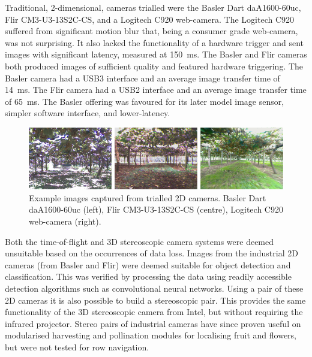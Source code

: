 \documentclass[preprint,authoryear,12pt]{elsarticle}
\begin{document}
        Traditional, 2-dimensional, cameras trialled were the Basler Dart daA1600-60uc, Flir CM3-U3-13S2C-CS, and a Logitech C920 web-camera.
        The Logitech C920 suffered from significant motion blur that, being a consumer grade web-camera, was not surprising.
        It also lacked the functionality of a hardware trigger and sent images with significant latency, measured at \SI{150}{\milli\second}.
        The Basler and Flir cameras both produced images of sufficient quality and featured hardware triggering.
        The Basler camera had a USB3 interface and an average image transfer time of \SI{14}{\milli\second}.
        The Flir camera had a USB2 interface and an average image transfer time of \SI{65}{\milli\second}.
        The Basler offering was favoured for its later model image sensor, simpler software interface, and lower-latency.

        \begin{figure}[htb]
            \centering
            \includegraphics[width=\linewidth]{imgs/camera_comparison/camera_comparison.pdf}
            \caption{
                Example images captured from trialled 2D cameras.
                Basler Dart daA1600-60uc (left), Flir CM3-U3-13S2C-CS (centre), Logitech C920 web-camera (right).
            }
            \label{fig:canopyDataCloud}
        \end{figure}

        Both the time-of-flight and 3D stereoscopic camera systems were deemed unsuitable based on the occurrences of data loss.
        Images from the industrial 2D cameras (from Basler and Flir) were deemed suitable for object detection and classification.
        This was verified by processing the data using readily accessible detection algorithms such as convolutional neural networks.
        Using a pair of these 2D cameras it is also possible to build a stereoscopic pair.
        This provides the same functionality of the 3D stereoscopic camera from Intel, but without requiring the infrared projector.
        Stereo pairs of industrial cameras have since proven useful on modularised harvesting and pollination modules for localising fruit and flowers, but were not tested for row navigation.
\end{document}
